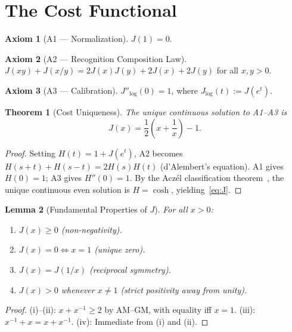 \documentclass[12pt,a4paper]{article}
\newtheorem{theorem}{Theorem}[section]
\newtheorem{lemma}[theorem]{Lemma}
\theoremstyle{definition}
\newtheorem{axiom_rs}{Axiom}
\theoremstyle{remark}
\begin{document}
\section{The Cost Functional}
\label{sec:cost}

\begin{axiom_rs}[A1 --- Normalization]
$J(1) = 0$.
\end{axiom_rs}

\begin{axiom_rs}[A2 --- Recognition Composition Law]
$J(xy) + J(x/y) = 2J(x)J(y) + 2J(x) + 2J(y)$ for all $x, y > 0$.
\end{axiom_rs}

\begin{axiom_rs}[A3 --- Calibration]
$J''_{\log}(0) = 1$, where $J_{\log}(t) := J(e^t)$.
\end{axiom_rs}

\begin{theorem}[Cost Uniqueness]
\label{thm:Junique}
The unique continuous solution to A1--A3 is
\begin{equation}
  J(x) = \frac{1}{2}\!\left(x + \frac{1}{x}\right) - 1.
  \label{eq:J}
\end{equation}
\end{theorem}

\begin{proof}
Setting $H(t) = 1 + J(e^t)$, A2 becomes $H(s+t) + H(s-t) = 2H(s)H(t)$
(d'Alembert's equation).  A1 gives $H(0) = 1$; A3 gives $H''(0) = 1$.
By the Acz\'el classification theorem~\cite{Aczel1966}, the unique
continuous even solution is $H = \cosh$, yielding~\eqref{eq:J}.
\end{proof}

\begin{lemma}[Fundamental Properties of $J$]
\label{lem:Jprops}
For all $x > 0$:
\begin{enumerate}[label=(\roman*)]
  \item $J(x) \geq 0$ (non-negativity).
  \item $J(x) = 0 \iff x = 1$ (unique zero).
  \item $J(x) = J(1/x)$ (reciprocal symmetry).
  \item $J(x) > 0$ whenever $x \neq 1$ (strict positivity away from unity).
\end{enumerate}
\end{lemma}

\begin{proof}
(i)--(ii): $x + x^{-1} \geq 2$ by AM--GM, with equality iff $x = 1$.
(iii): $x^{-1} + x = x + x^{-1}$.  (iv): Immediate from (i) and (ii).
\end{proof}
\end{document}
